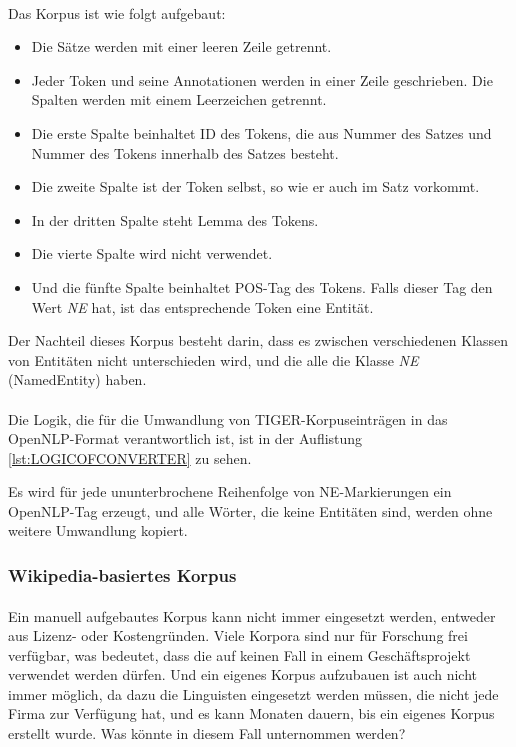 \paragraph{}
Das Korpus ist wie folgt aufgebaut:
\begin{itemize}
\item Die Sätze werden mit einer leeren Zeile getrennt.
\item Jeder Token und seine Annotationen werden in einer Zeile geschrieben. Die Spalten werden mit einem Leerzeichen getrennt.
\item Die erste Spalte beinhaltet ID des Tokens, die aus Nummer des Satzes und Nummer des Tokens innerhalb des Satzes besteht.
\item Die zweite Spalte ist der Token selbst, so wie er auch im Satz vorkommt.
\item In der dritten Spalte steht Lemma des Tokens.
\item Die vierte Spalte wird nicht verwendet.
\item Und die fünfte Spalte beinhaltet POS-Tag des Tokens. Falls dieser Tag den Wert \textit{NE} hat, ist das entsprechende Token eine Entität.
\end{itemize}

Der Nachteil dieses Korpus besteht darin, dass es zwischen verschiedenen Klassen von Entitäten nicht unterschieden wird, und die alle die Klasse \textit{NE} (NamedEntity) haben.

\paragraph{}
Die Logik, die für die Umwandlung von TIGER-Korpuseinträgen in das OpenNLP-Format verantwortlich ist, ist in der Auflistung \ref{lst:LOGICOFCONVERTER} zu sehen.

Es wird für jede ununterbrochene Reihenfolge von NE-Markierungen ein OpenNLP-Tag erzeugt, und alle Wörter, die keine Entitäten sind, werden ohne weitere Umwandlung kopiert.

\subsubsection{Wikipedia-basiertes Korpus}
\paragraph{}
Ein manuell aufgebautes Korpus kann nicht immer eingesetzt werden, entweder aus Lizenz- oder Kostengründen. Viele Korpora sind nur für Forschung frei verfügbar, was bedeutet, dass die auf keinen Fall in einem Geschäftsprojekt verwendet werden dürfen. Und ein eigenes Korpus aufzubauen ist auch nicht immer möglich, da dazu die Linguisten eingesetzt werden müssen, die nicht jede Firma zur Verfügung hat, und es kann Monaten dauern, bis ein eigenes Korpus erstellt wurde. Was könnte in diesem Fall unternommen werden?

